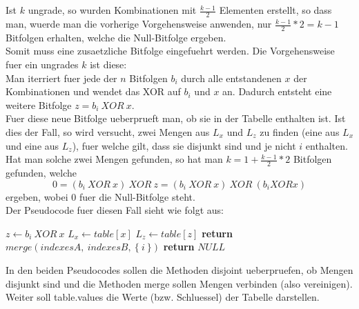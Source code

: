 \documentclass[a4paper,10pt,ngerman]{scrartcl}
\begin{document}
\\\\
Ist $k$ ungrade, so wurden Kombinationen mit $\frac{k-1}{2}$ Elementen erstellt, so dass man, wuerde man die vorherige Vorgehensweise anwenden, nur $\frac{k-1}{2} * 2 = k-1$ Bitfolgen erhalten, welche die Null-Bitfolge ergeben. \\
Somit muss eine zusaetzliche Bitfolge eingefuehrt werden. Die Vorgehensweise fuer ein ungrades $k$ ist diese:\\
Man iterriert fuer jede der $n$ Bitfolgen $b_i$ durch alle entstandenen $x$ der Kombinationen und wendet das XOR auf $b_i$ und $x$ an. Dadurch entsteht eine weitere Bitfolge $z = b_i \ XOR \ x$.\\
Fuer diese neue Bitfolge ueberprueft man, ob sie in der Tabelle enthalten ist. Ist dies der Fall, so wird versucht, zwei Mengen aus $L_x$ und $L_z$ zu finden (eine aus $L_x$ und eine aus $L_z$), fuer welche gilt, dass sie disjunkt sind und je nicht $i$ enthalten.\\
Hat man solche zwei Mengen gefunden, so hat man $k = 1 + \frac{k-1}{2} * 2$ Bitfolgen gefunden, welche
$$
0 = (b_i \ XOR \ x) \ XOR \ z = (b_i \ XOR \ x) \ XOR \ (b_i XOR x)
$$
ergeben, wobei $0$ fuer die Null-Bitfolge steht.\\
Der Pseudocode fuer diesen Fall sieht wie folgt aus:
\begin{algorithmic}[1]
							\State $z \gets b_i \ XOR \ x$
							\State $L_x \gets table[x]$
							\State $L_z \gets table[z]$
																\State \textbf{return} $merge(indexesA, \ indexesB, \ \{ \ i \ \})$
													\EndIf
											\EndFor
									\EndFor
							\EndIf
				\EndFor
		\EndFor
		\State \textbf{return} $NULL$
\EndProcedure
\end{algorithmic}

In den beiden Pseudocodes sollen die Methoden disjoint ueberpruefen, ob Mengen disjunkt sind und die Methoden merge sollen Mengen verbinden (also vereinigen). \\
Weiter soll table.values die Werte (bzw. Schluessel) der Tabelle darstellen.
\end{document}
